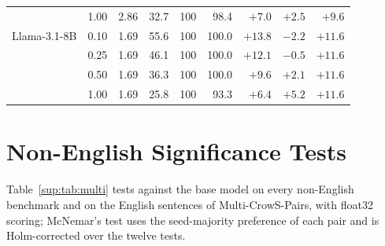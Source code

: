 \begin{table}[h]
\begin{tabular}{@{}lrrrrrrrr@{}}
     & 1.00 & 2.86 & 32.7 & 100 & 98.4 & $+7.0$ & $+2.5$ & $+9.6$ \\
    Llama-3.1-8B & 0.10 & 1.69 & 55.6 & 100 & 100.0 & $+13.8$ & $-2.2$ & $+11.6$ \\
     & 0.25 & 1.69 & 46.1 & 100 & 100.0 & $+12.1$ & $-0.5$ & $+11.6$ \\
     & 0.50 & 1.69 & 36.3 & 100 & 100.0 & $+9.6$ & $+2.1$ & $+11.6$ \\
     & 1.00 & 1.69 & 25.8 & 100 & 93.3 & $+6.4$ & $+5.2$ & $+11.6$ \\
    \bottomrule
  \end{tabular}
\end{table}

\section{Non-English Significance Tests}
\label{sup:multi}

Table~\ref{sup:tab:multi} tests \PEAT{} against the base model on every non-English benchmark and on
the English sentences of Multi-CrowS-Pairs, with float32 scoring; McNemar's test uses the seed-majority
preference of each pair and is Holm-corrected over the twelve tests.

